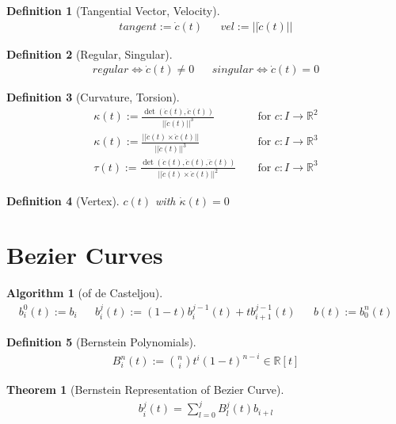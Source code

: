 \documentclass[conference]{IEEEtran}
\newtheorem{algorithm}{Algorithm}
\newtheorem{definition}{Definition}
\newtheorem{theorem}{Theorem}
\begin{document}
\begin{definition}[Tangential Vector, Velocity]
	\begin{align*}
		tangent := \dot{c}(t) && vel := ||\dot{c}(t)||
	\end{align*}
\end{definition}

\begin{definition}[Regular, Singular]
	\begin{align*}
		regular \iff \dot{c}(t) \neq 0 && singular \iff \dot{c}(t) = 0
	\end{align*}
\end{definition}

\begin{definition}[Curvature, Torsion]
	\begin{align*}
		\kappa(t) := \frac{\det(\dot{c}(t), \ddot{c}(t))}{||\dot{c}(t)||^3} && \text{ for } c:I \rightarrow \mathbb{R}^2\\
		\kappa(t) := \frac{||\dot{c}(t) \times \ddot{c}(t)||}{||\dot{c}(t)||^3} && \text{ for } c:I \rightarrow \mathbb{R}^3\\
		\tau(t) := \frac{\det(\dot{c}(t), \ddot{c}(t), \dddot{c}(t))}{||\dot{c}(t) \times \ddot{c}(t)||^2} && \text{ for } c:I \rightarrow \mathbb{R}^3
	\end{align*}
\end{definition}

\begin{definition}[Vertex]
	$c(t)$ with $\dot{\kappa}(t) = 0$
\end{definition}
	
\section{Bezier Curves}

\begin{algorithm}[of de Casteljou]
	\begin{align*}
		b_i^0(t):= b_i && b_i^j(t) := (1-t)b_i^{j-1}(t) + t b_{i+1}^{j-1}(t) && b(t) := b_0^n(t)
	\end{align*}
\end{algorithm}

\begin{definition}[Bernstein Polynomials]
	\begin{align*}
		B_i^n(t) := \binom{n}{i} t^i (1-t)^{n-i} \in \mathbb{R}[t]
	\end{align*}
\end{definition}

\begin{theorem}[Bernstein Representation of Bezier Curve]
	\begin{align*}
		b_i^j(t) = \sum_{l=0}^{j} B_l^j(t) b_{i+l}
	\end{align*}
\end{theorem}
\end{document}
